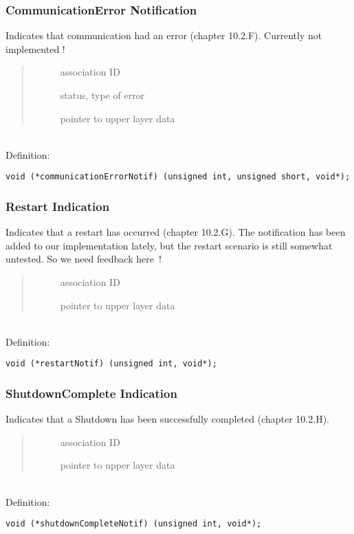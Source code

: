 \documentclass[10pt]{article}
\newcommand{\bv}{\vspace{0,1cm}\noindent \\ Definition:\footnotesize\begin{verbatim}}
\newcommand{\n}{\normalsize}
\newcommand{\no}{ }
\begin{document}
\subsubsection{CommunicationError Notification}
Indicates that communication had an error (chapter 10.2.F).
Currently not implemented !
\begin{quote} \begin{description} \no
 \item[] association ID
 \item[] status, type of error
 \item[] pointer to upper layer data
\end{description} \end{quote}
\bv
void (*communicationErrorNotif) (unsigned int, unsigned short, void*);
\end{verbatim}\n

\subsubsection{Restart Indication}
Indicates that a restart has occurred (chapter 10.2.G).
The notification has been added to our implementation lately,
but the restart scenario is still somewhat untested. So we need
feedback here~!
\begin{quote} \begin{description} \no
 \item[] association ID
 \item[] pointer to upper layer data
\end{description} \end{quote}
\bv
void (*restartNotif) (unsigned int, void*);
\end{verbatim}\n

\subsubsection{ShutdownComplete Indication}
Indicates that a Shutdown has been successfully completed (chapter 10.2.H).
\begin{quote} \begin{description} \no
 \item[] association ID
 \item[] pointer to upper layer data
\end{description} \end{quote}
\bv
void (*shutdownCompleteNotif) (unsigned int, void*);
\end{verbatim}\n
\end{document}
